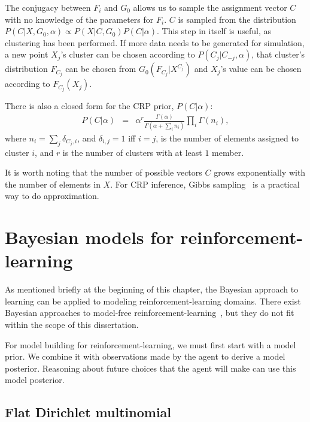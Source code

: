 The conjugacy between $F_i$ and $G_0$ allows us to sample the assignment vector $C$ with no knowledge of the parameters for $F_i$. $C$ is sampled from the distribution $P(C|X,G_0,\alpha)\propto P(X|C,G_0)P(C|\alpha)$. This step in itself is useful, as clustering has been performed. If more data needs to be generated for simulation, a new point $X_j$'s cluster can be chosen according to $P(C_j|C_{-j},\alpha)$, that cluster's distribution $F_{C_j}$ can be chosen from $G_0(F_{C_j}|X^{C_j})$ and $X_j$'s value can be chosen according to $F_{C_j}(X_j)$.

There is also a closed form for the CRP prior, $P(C|\alpha)$:
\begin{eqnarray}
P(C|\alpha)&=&\alpha^r \frac {\Gamma(\alpha)}{\Gamma(\alpha+\sum_i n_i)}\prod_i\Gamma(n_i),\label{eq:crp}
\end{eqnarray}
where $n_i = \sum_{j} \delta_{C_j,i}$, and $\delta_{i,j}=1$ iff $i=j$, is the number of elements assigned to cluster $i$, and $r$ is the number of clusters with at least $1$ member.

It is worth noting that the number of possible vectors $C$ grows exponentially with the number of elements in $X$. For CRP inference, Gibbs sampling~\cite{andrieu03,neal00} is a practical way to do approximation.

\section{Bayesian models for reinforcement-learning}

As mentioned briefly at the beginning of this chapter, the Bayesian approach to learning can be applied to modeling reinforcement-learning domains. There exist Bayesian approaches to model-free reinforcement-learning~\cite{dearden98}, but they do not fit within the scope of this dissertation. 

For model building for reinforcement-learning, we must first start with a model prior. We combine it with observations made by the agent to derive a model posterior. Reasoning about future choices that the agent will make can use this model posterior. 

\subsection{Flat Dirichlet multinomial}

\label{intro:fdm}

